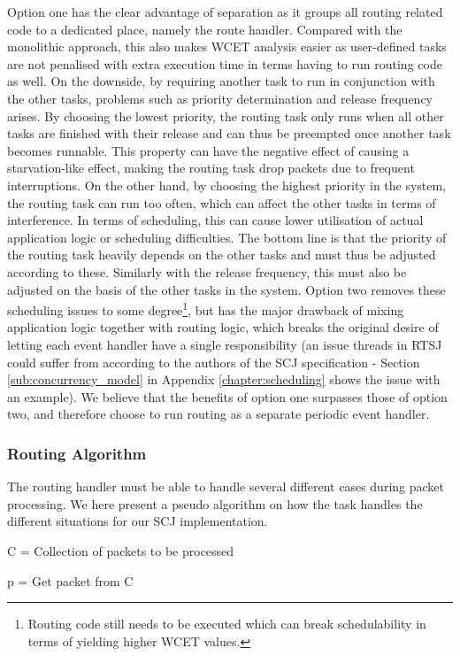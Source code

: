 Option one has the clear advantage of separation as it groups all routing related code to a dedicated place, namely the route handler. Compared with the monolithic approach, this also makes WCET analysis easier as user-defined tasks are not penalised with extra execution time in terms having to run routing code as well. On the downside, by requiring another task to run in conjunction with the other tasks, problems such as priority determination and release frequency arises. By choosing the lowest priority, the routing task only runs when all other tasks are finished with their release and can thus be preempted once another task becomes runnable. This property can have the negative effect of causing a starvation-like effect, making the routing task drop packets due to frequent interruptions. On the other hand, by choosing the highest priority in the system, the routing task can run too often, which can affect the other tasks in terms of interference. In terms of scheduling, this can cause lower utilisation of actual application logic or scheduling difficulties. The bottom line is that the priority of the routing task heavily depends on the other tasks and must thus be adjusted according to these. Similarly with the release frequency, this must also be adjusted on the basis of the other tasks in the system. Option two removes these scheduling issues to some degree\footnote{Routing code still needs to be executed which can break schedulability in terms of yielding higher WCET values.}, but has the major drawback of mixing application logic together with routing logic, which breaks the original desire of letting each event handler have a single responsibility (an issue threads in RTSJ could suffer from according to the authors of the SCJ specification - Section \ref{sub:concurrency_model} in Appendix \ref{chapter:scheduling} shows the issue with an example). We believe that the benefits of option one surpasses those of option two, and therefore choose to run routing as a separate periodic event handler.

\subsubsection{Routing Algorithm}
The routing handler must be able to handle several different cases during packet processing. We here present a pseudo algorithm on how the task handles the different situations for our SCJ implementation.

C = Collection of packets to be processed

p = Get packet from C
